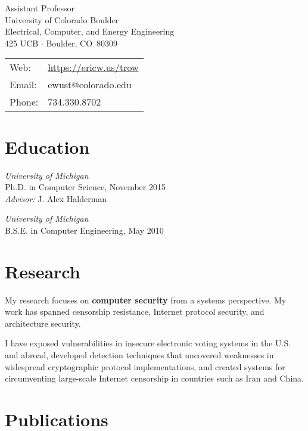 \documentclass[margin,11pt]{res} %
\begin{document}
\begin{adjustwidth}{-1.3in}{0pt}
\vspace{20pt}

\noindent 
\parbox[m]{4in}{
Assistant Professor \\
University of Colorado Boulder\\
Electrical, Computer, and Energy Engineering\\
425 UCB $\cdot$ Boulder, CO \,80309
}
\begin{tabular}{ll}
{Web}:&\url{https://ericw.us/trow}\\
{Email}:&ewust@colorado.edu\\
{Phone}:& 734.330.8702
\end{tabular}
\vspace{10pt}
\end{adjustwidth}

\section{\large Education}

        \emph{University of Michigan}\\
        Ph.D. in Computer Science, November 2015\\
        \emph{Advisor:} J. Alex Halderman

        \emph{University of Michigan}\\
        B.S.E. in Computer Engineering, May 2010

\vspace{6pt}
\section{\large Research}

My research focuses on \textbf{computer security} from a systems perspective. My work has spanned censorship resistance, Internet protocol security, and architecture security.

I have exposed vulnerabilities in insecure electronic voting systems in the U.S. and abroad, developed detection techniques that uncovered weaknesses in widespread cryptographic protocol implementations, and created systems for circumventing large-scale Internet censorship in countries such as Iran and China.

\vspace{6pt}
\section{\large Publications}
\end{document}
